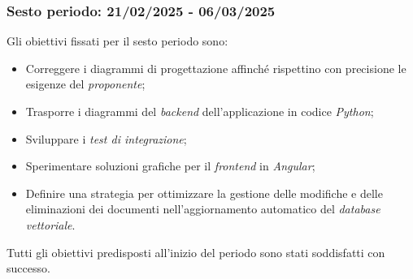 \subsubsection{Sesto periodo: 21/02/2025 - 06/03/2025}
\label{sec:prev_cons_sesto_periodo}  
Gli obiettivi fissati per il sesto periodo sono:
\begin{itemize}
    \item Correggere i diagrammi di progettazione affinché rispettino con precisione le esigenze del \emph{proponente};
    \item Trasporre i diagrammi del \emph{backend} dell'applicazione in codice \emph{Python};
    \item Sviluppare i \emph{test di integrazione};
    \item Sperimentare soluzioni grafiche per il \emph{frontend} in \emph{Angular};
    \item Definire una strategia per ottimizzare la gestione delle modifiche e delle eliminazioni dei documenti nell'aggiornamento automatico del \emph{database vettoriale}.
\end{itemize}

Tutti gli obiettivi predisposti all'inizio del periodo sono stati soddisfatti con successo.\\

